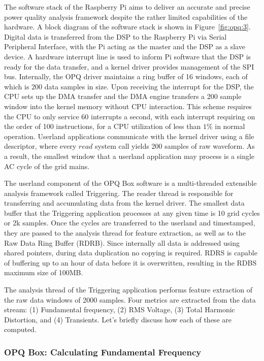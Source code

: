 The software stack of the Raspberry Pi aims to deliver an accurate and precise power quality analysis framework despite the rather limited capabilities of the hardware.
A block diagram of the software stack is shown in Figure~\ref{fig:opq:3}.
Digital data is transferred from the DSP to the Raspberry Pi via Serial Peripheral Interface, with the Pi acting as the master and the DSP as a slave device.
A hardware interrupt line is used to inform Pi software that the DSP is ready for the data transfer, and a kernel driver provides management of the SPI bus.
Internally, the OPQ driver maintains a ring buffer of 16 windows, each of which is 200 data samples in size.
Upon receiving the interrupt for the DSP, the CPU sets up the DMA transfer and the DMA engine transfers a 200 sample window into the kernel memory without CPU interaction.
This scheme requires the CPU to only service 60 interrupts a second, with each interrupt requiring on the order of 100 instructions, for a CPU utilization of less than $1\%$ in normal operation.
Userland applications communicate with the kernel driver using a file descriptor, where every $read$ system call yields 200 samples of raw waveform.
As a result, the smallest window that a userland application may process is a single AC cycle of the grid mains.

The userland component of the OPQ Box software is a multi-threaded extensible analysis framework called Triggering.
The reader thread is responsible for transferring and accumulating data from the kernel driver.
The smallest data buffer that the Triggering application processes at any given time is 10 grid cycles or 2k samples.
Once the cycles are transferred to the userland and timestamped, they are passed to the analysis thread for feature extraction, as well as to the Raw Data Ring Buffer (RDRB).
Since internally all data is addressed using shared pointers, during data duplication no copying is required.
RDRS is capable of buffering up to an hour of data before it is overwritten, resulting in the RDBS maximum size of 100MB.

The analysis thread of the Triggering application performs feature extraction of the raw data windows of 2000 samples.
Four metrics are extracted from the data stream: (1) Fundamental frequency, (2) RMS Voltage, (3) Total Harmonic Distortion, and (4) Transients. Let's briefly discuss how each of these are computed.

\subsubsection{OPQ Box: Calculating Fundamental Frequency}\label{subsec:fundamental-frequency}

